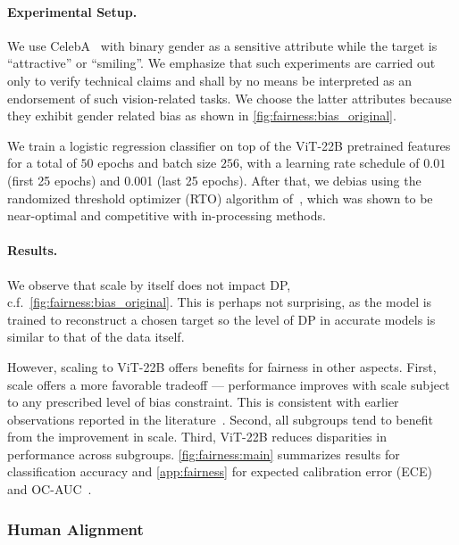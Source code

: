 \documentclass{article}
\newcommand{\chonk}{\mbox{ViT-22B}\xspace}
\begin{document}
\paragraph{Experimental Setup.} We use CelebA~\citep{liu2015faceattributes} with binary gender as a sensitive attribute while the target is  ``attractive'' or ``smiling''. We emphasize that such experiments are carried out only to verify technical claims and shall by no means be interpreted as an endorsement of such vision-related tasks. We choose the latter attributes because they exhibit gender related bias as shown in \cref{fig:fairness:bias_original}.

We train a logistic regression classifier on top of the \chonk pretrained features for a total of $50$ epochs and batch size $256$, with a learning rate schedule of $0.01$ (first 25 epochs) and 0.001 (last 25 epochs).  After that, we debias using the randomized threshold optimizer (RTO) algorithm of~\citet{alabdulmohsin2021}, which was shown to be near-optimal and competitive with in-processing methods. 

\paragraph{Results.}
We observe that scale by itself does not impact DP, c.f.\ \cref{fig:fairness:bias_original}. This is perhaps not surprising, as the model is trained to reconstruct a chosen target so the level of DP in accurate models is similar to that of the data itself.

However, scaling to \chonk offers benefits for fairness in other aspects. First, scale offers a more favorable tradeoff ---  performance improves with scale subject to any prescribed level of bias constraint.
This is consistent with earlier observations reported in the literature~\citep{alabdulmohsin2021}.  Second, all subgroups tend to benefit from the improvement in scale. Third, \chonk reduces disparities in performance across subgroups. 
\cref{fig:fairness:main} summarizes results for classification accuracy and \cref{app:fairness} for expected calibration error (ECE)~\citep{naeini2015obtaining,guo2017calibration} and OC-AUC~\citep{kivlichan2021measuring}.

\subsubsection{Human Alignment}
\label{subsec:error consistency}
\end{document}
